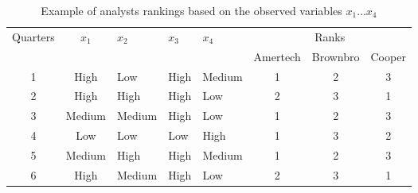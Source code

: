 %
%
%
%       
%
%
%
%
       
 \begin{table}[hp]
\centering
{}
\small\addtolength{\tabcolsep}{-1pt}
\caption{Example of analysts rankings based on the observed variables $x_1 \ldots x_4$ }
 \begin{tabular}{cclllccc}
\toprule
Quarters&$x_1$&$x_2$&$x_3$&$x_4$&\multicolumn{3}{c}{Ranks}\\
\cline{6-8}
&&&&&Amertech& Brownbro&Cooper\\
\midrule
1&High&Low&High&Medium&1& 2& 3\\
2&High&High&High&Low& 2& 3& 1\\
3&Medium&Medium&High&Low&1 &2& 3\\
4&Low&Low&Low&High&1& 3& 2\\
5&     Medium&        High&    High& Medium& 1 &2& 3\\
6&     High&       Medium&   High& Low& 2 &3& 1\\
\bottomrule
 \end{tabular} 
\label{tab01}
\end{table}

